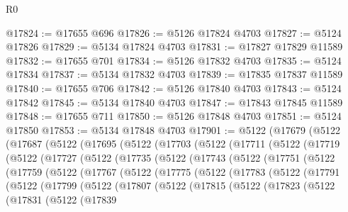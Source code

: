 \begin{lexlean}{R0}
\begin{coremodule}
@17824 := @17655 @696
@17826 := @5126 @17824 @4703
@17827 := @5124 @17826
@17829 := @5134 @17824 @4703
@17831 := @17827 @17829 @11589
@17832 := @17655 @701
@17834 := @5126 @17832 @4703
@17835 := @5124 @17834
@17837 := @5134 @17832 @4703
@17839 := @17835 @17837 @11589
@17840 := @17655 @706
@17842 := @5126 @17840 @4703
@17843 := @5124 @17842
@17845 := @5134 @17840 @4703
@17847 := @17843 @17845 @11589
@17848 := @17655 @711
@17850 := @5126 @17848 @4703
@17851 := @5124 @17850
@17853 := @5134 @17848 @4703
@17901 := @5122
    (@17679
      (@5122
        (@17687
          (@5122
            (@17695
              (@5122
                (@17703
                  (@5122
                    (@17711
                      (@5122
                        (@17719
                          (@5122
                            (@17727
                              (@5122
                                (@17735
                                  (@5122
                                    (@17743
                                      (@5122
                                        (@17751
                                          (@5122
                                            (@17759
                                              (@5122
                                                (@17767
                                                  (@5122
                                                    (@17775
                                                      (@5122
                                                        (@17783
                                                          (@5122
                                                            (@17791
                                                              (@5122
                                                                (@17799
                                                                  (@5122
                                                                    (@17807
                                                                      (@5122
                                                                        (@17815
                                                                          (@5122
                                                                            (@17823
                                                                              (@5122
                                                                                (@17831
                                                                                  (@5122
                                                                                    (@17839

\end{coremodule}
\end{lexlean}
